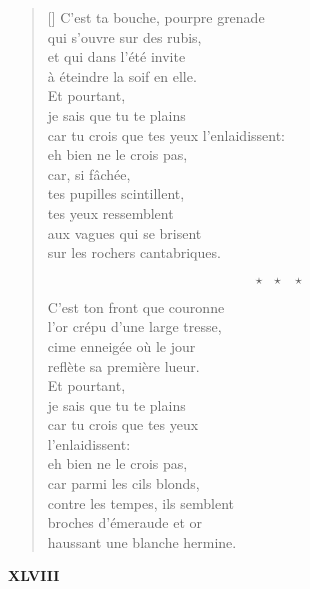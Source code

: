 \documentclass[a4paper,12pt]{book}
\begin{document}
\begin{verse}[\versewidth]
  C'est ta bouche, pourpre grenade \\  %
  qui s'ouvre sur des rubis, \\             %
  et qui dans l'été invite \\
  à éteindre la soif en elle. \\
  Et pourtant, \\
  je sais que tu te plains \\
  car tu crois que tes yeux
  l'enlaidissent: \\
  eh bien ne le crois pas, \\
  car, si fâchée, \\
  tes pupilles scintillent, \\
  tes yeux ressemblent \\
  aux vagues qui se brisent \\
  sur les rochers cantabriques.

  $$\star \ \ \ \star \ \ \ \star$$

  C'est ton front que couronne \\
  l'or crépu d'une large tresse, \\
  cime enneigée où le jour \\
  reflète sa première lueur. \\
  Et pourtant, \\
  je sais que tu te plains \\
  car tu crois que tes yeux \\
  l'enlaidissent: \\
  eh bien ne le crois pas, \\
  car parmi les cils blonds, \\
  contre les tempes, ils semblent \\
  broches d'émeraude et or \\
  haussant une blanche hermine.

\end{verse}


\begin{center}
  \textbf{XLVIII}
\end{center}
\end{document}
